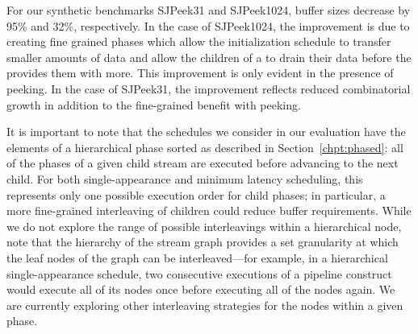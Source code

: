 For our synthetic benchmarks SJPeek31 and SJPeek1024, buffer sizes
decrease by 95\% and 32\%, respectively. In the case of SJPeek1024,
the improvement is due to creating fine grained phases which allow the
initialization schedule to transfer smaller amounts of data and allow
the children of a {\splitjoin} to drain their data before the
{\splitter} provides them with more. This improvement is only evident
in the presence of peeking. In the case of SJPeek31, the improvement
reflects reduced combinatorial growth in addition to the fine-grained
benefit with peeking.

It is important to note that the schedules we consider in our
evaluation have the elements of a hierarchical phase sorted as
described in Section~\ref{chpt:phased}: all of the phases of a given
child stream are executed before advancing to the next child.  For
both single-appearance and minimum latency scheduling, this represents
only one possible execution order for child phases; in particular, a
more fine-grained interleaving of children could reduce buffer
requirements.  While we do not explore the range of possible
interleavings within a hierarchical node, note that the hierarchy of
the stream graph provides a set granularity at which the leaf nodes of
the graph can be interleaved---for example, in a hierarchical
single-appearance schedule, two consecutive executions of a pipeline
construct would execute all of its nodes once before executing all of
the nodes again.  We are currently exploring other interleaving
strategies for the nodes within a given phase.
